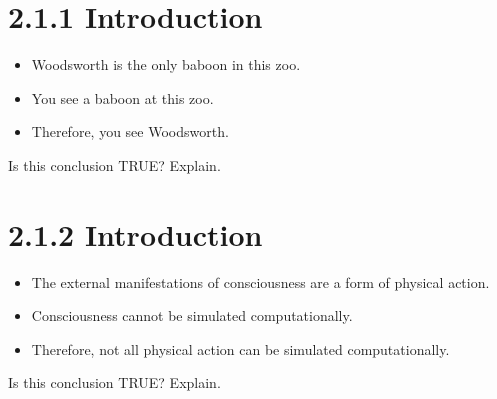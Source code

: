 \documentclass{article}
\begin{document}
\section*{2.1.1 Introduction}
\begin{itemize}
    \item Woodsworth is the only baboon in this zoo.
    \item You see a baboon at this zoo.
    \item Therefore, you see Woodsworth.
\end{itemize}
Is this conclusion TRUE? Explain.

\section*{2.1.2 Introduction}
\begin{itemize}
    \item The external manifestations of consciousness are a form of physical action.
    \item Consciousness cannot be simulated computationally.
    \item Therefore, not all physical action can be simulated computationally.
\end{itemize}
Is this conclusion TRUE? Explain.
\end{document}
